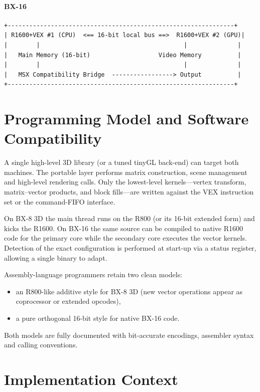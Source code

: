 \documentclass[11pt,a4paper]{article}
\begin{document}
\paragraph{BX-16}
\begin{verbatim}
+---------------------------------------------------------------+
| R1600+VEX #1 (CPU)  <== 16-bit local bus ==>  R1600+VEX #2 (GPU)|
|        |                                        |              |
|   Main Memory (16-bit)                   Video Memory          |
|        |                                        |              |
|   MSX Compatibility Bridge  -----------------> Output          |
+---------------------------------------------------------------+
\end{verbatim}

\section{Programming Model and Software Compatibility}

A single high-level 3D library (or a tuned tinyGL back-end) can target both machines. The portable layer performs matrix construction, scene management and high-level rendering calls. Only the lowest-level kernels---vertex transform, matrix--vector products, and block fills---are written against the VEX instruction set or the command-FIFO interface.

On BX-8 3D the main thread runs on the R800 (or its 16-bit extended form) and kicks the R1600. On BX-16 the same source can be compiled to native R1600 code for the primary core while the secondary core executes the vector kernels. Detection of the exact configuration is performed at start-up via a status register, allowing a single binary to adapt.

Assembly-language programmers retain two clean models:

\begin{itemize}
    \item an R800-like additive style for BX-8 3D (new vector operations appear as coprocessor or extended opcodes),
    \item a pure orthogonal 16-bit style for native BX-16 code.
\end{itemize}

Both models are fully documented with bit-accurate encodings, assembler syntax and calling conventions.

\section{Implementation Context}
\end{document}
